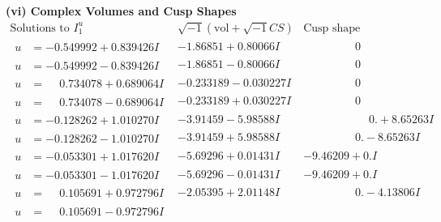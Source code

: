 \documentclass[1p]{elsarticle_modified}
\theoremstyle{definition}
\newcommand{\I}{\sqrt{-1}}
\begin{document}
\newpage\flushleft \textbf{(vi) Complex Volumes and Cusp Shapes}
$$\begin{array}{c|c|c}  
\text{Solutions to }I^u_{1}& \I (\text{vol} + \sqrt{-1}CS) & \text{Cusp shape}\\
 \hline 
\begin{aligned}
u &= -0.549992 + 0.839426 I\end{aligned}
 & -1.86851 + 0.80066 I & \phantom{-0.000000 } 0 \\ \hline\begin{aligned}
u &= -0.549992 - 0.839426 I\end{aligned}
 & -1.86851 - 0.80066 I & \phantom{-0.000000 } 0 \\ \hline\begin{aligned}
u &= \phantom{-}0.734078 + 0.689064 I\end{aligned}
 & -0.233189 - 0.030227 I & \phantom{-0.000000 } 0 \\ \hline\begin{aligned}
u &= \phantom{-}0.734078 - 0.689064 I\end{aligned}
 & -0.233189 + 0.030227 I & \phantom{-0.000000 } 0 \\ \hline\begin{aligned}
u &= -0.128262 + 1.010270 I\end{aligned}
 & -3.91459 - 5.98588 I & \phantom{-0.000000 -}0. + 8.65263 I \\ \hline\begin{aligned}
u &= -0.128262 - 1.010270 I\end{aligned}
 & -3.91459 + 5.98588 I & \phantom{-0.000000 } 0. - 8.65263 I \\ \hline\begin{aligned}
u &= -0.053301 + 1.017620 I\end{aligned}
 & -5.69296 + 0.01431 I & -9.46209 + 0. I\phantom{ +0.000000I} \\ \hline\begin{aligned}
u &= -0.053301 - 1.017620 I\end{aligned}
 & -5.69296 - 0.01431 I & -9.46209 + 0. I\phantom{ +0.000000I} \\ \hline\begin{aligned}
u &= \phantom{-}0.105691 + 0.972796 I\end{aligned}
 & -2.05395 + 2.01148 I & \phantom{-0.000000 } 0. - 4.13806 I \\ \hline\begin{aligned}
u &= \phantom{-}0.105691 - 0.972796 I\end{aligned}

\end{array}$$
\end{document}
